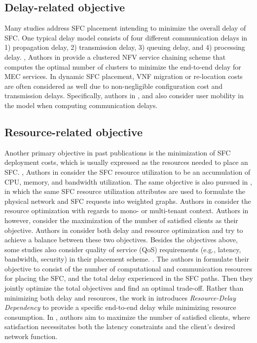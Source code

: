 \subsection{Delay-related objective}
Many studies address SFC placement intending to minimize the overall delay of SFC. One typical delay model consists of four different communication delays in 1) propagation delay, 2) transmission delay, 3) queuing delay, and 4) processing delay\cite{SFCedgecloud}. 
\eg, Authors in \cite{clusteredSFCplacement} provide a clustered NFV service chaining scheme that computes the optimal number of clusters to minimize the end-to-end delay for MEC services.
In dynamic SFC placement, VNF migration or re-location costs are often considered as well\cite{dynamicVNFedge, VNF5G, MABserviceplacement} due to non-negligible configuration cost and transmission delays.
Specifically, authors in \cite{dynamicVNFedge}, and \cite{MABserviceplacement} also consider user mobility in the model when computing communication delays.

\subsection{Resource-related objective}
Another primary objective in past publications is the minimization of SFC deployment costs, which is usually expressed as the resources needed to place an SFC. \eg, Authors in \cite{SFCedgecomputingenablednetworks} consider the SFC resource utilization to be an accumulation of CPU, memory, and bandwidth utilization. The same objective is also pursued in \cite{PosterMEC}, in which the same SFC resource utilization attributes are used to formulate the physical network and SFC requests into weighted graphs. Authors in \cite{VNFmonoedgecore} consider the resource optimization with regards to mono- or multi-tenant context.
Authors in \cite{LatencyAwareMEC} however, consider the maximization of the number of satisfied clients as their objective.  
Authors in \cite{SFCedgecloud, Delay-awareVNFFlexibleResourceAllocation} consider both delay and resource optimization and try to achieve a balance between these two objectives.
Besides the objectives above, some studies also consider quality of service (QoS) requirements (e.g., latency, bandwidth, security) in their placement scheme. \cite{ProbabilisticQoSEdge, dynamicVNFedge, VNFmonoedgecore, VNF5G, SFCedgecloud}.
The authors in  \cite{SFCedgecloud} formulate their objective to consist of the number of computational and
communication resources for placing the SFC, and the total delay experienced in the SFC paths. Then they jointly optimize the total objectives and find an optimal trade-off.
Rather than minimizing both delay and resources, the work in \cite{Delay-awareVNFFlexibleResourceAllocation} introduces \textit{Resource-Delay Dependency} to provide a specific end-to-end delay while minimizing resource consumption.
In \cite{LatencyAwareMEC}, authors aim to maximize the number of satisfied clients, where satisfaction necessitates both the latency constraints and the client's desired network function. 

